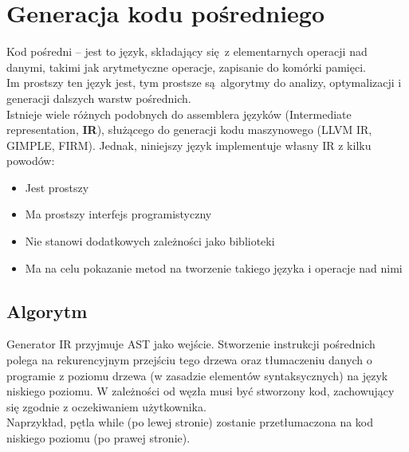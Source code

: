 \documentclass[leqno, 12pt]{article}
\begin{document}
	\section{Generacja kodu pośredniego}
		
		Kod pośredni -- jest to język, składający się z elementarnych operacji nad danymi, takimi jak
		arytmetyczne operacje, zapisanie do komórki pamięci.
		\\
		
		Im prostszy ten język jest, tym prostsze
		są algorytmy do analizy, optymalizacji i generacji dalszych warstw pośrednich.
		\\
		
		Istnieje wiele różnych podobnych do assemblera języków (Intermediate representation, \textbf{IR}), służącego
		do generacji kodu maszynowego (LLVM IR, GIMPLE, FIRM). Jednak, niniejszy język implementuje własny IR z
		kilku powodów:
		
		\begin{itemize}
			\item Jest prostszy
			\item Ma prostszy interfejs programistyczny
			\item Nie stanowi dodatkowych zależności jako biblioteki
			\item Ma na celu pokazanie metod na tworzenie takiego języka i operacje nad nimi
		\end{itemize}
		
		\subsection{Algorytm}
			Generator IR przyjmuje AST jako wejście. Stworzenie instrukcji pośrednich
			polega na rekurencyjnym przejściu tego drzewa oraz tłumaczeniu danych o
			programie z poziomu drzewa (w zasadzie elementów syntaksycznych) na język
			niskiego poziomu. W zależności od węzła musi być stworzony kod, zachowujący
			się zgodnie z oczekiwaniem użytkownika.
			\\
			
			Naprzykład, pętla while (po lewej stronie) zostanie przetłumaczona na
			kod niskiego poziomu (po prawej stronie).
\end{document}
